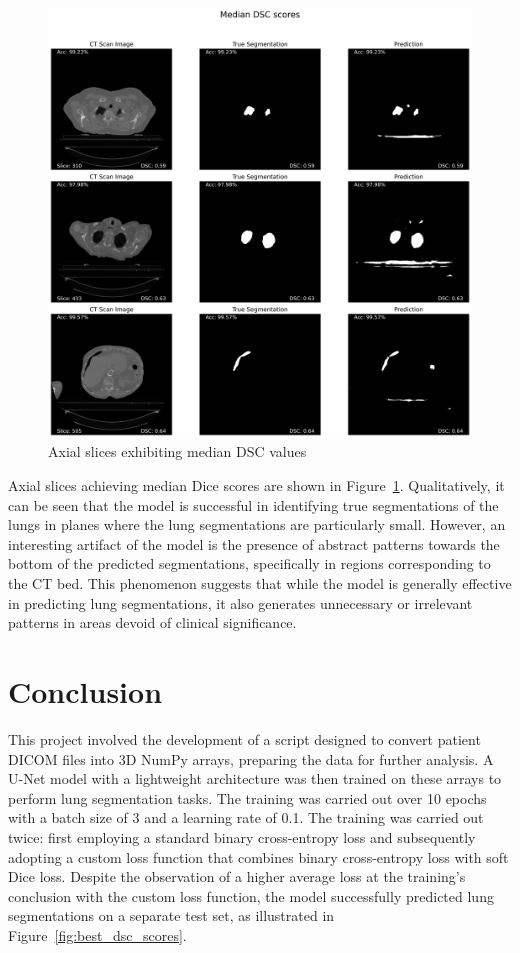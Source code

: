 \documentclass[12pt]{report}
\begin{document}
\begin{figure}[ht]
    \centering
    \includegraphics[width=\textwidth]{Median_DSC_scores.png}
    \caption{Axial slices exhibiting median DSC values}
    \label{fig:med_dsc_scores}
\end{figure}

Axial slices achieving median Dice scores are shown in Figure~\ref{fig:med_dsc_scores}. Qualitatively, it can be seen that the model is successful in identifying true segmentations of the lungs in planes where the lung segmentations are particularly small. However, an interesting artifact of the model is the presence of abstract patterns towards the bottom of the predicted segmentations, specifically in regions corresponding to the CT bed. This phenomenon suggests that while the model is generally effective in predicting lung segmentations, it also generates unnecessary or irrelevant patterns in areas devoid of clinical significance.

\chapter{Conclusion}

This project involved the development of a script designed to convert patient DICOM files into 3D NumPy arrays, preparing the data for further analysis. A U-Net model with a lightweight architecture was then trained on these arrays to perform lung segmentation tasks. The training was carried out over 10 epochs with a batch size of 3 and a learning rate of 0.1. The training was carried out twice: first employing a standard binary cross-entropy loss and subsequently adopting a custom loss function that combines binary cross-entropy loss with soft Dice loss. Despite the observation of a higher average loss at the training's conclusion with the custom loss function, the model successfully predicted lung segmentations on a separate test set, as illustrated in Figure~\ref{fig:best_dsc_scores}.
\end{document}
